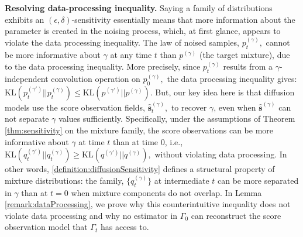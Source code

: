 \documentclass[11pt]{article}
\newcommand{\becca}[1]{\textcolor{dkred}{[becca: #1]}}
\theoremstyle{plain}
\newcommand{\1}{\mathbbm{1}}
\newcommand{\pdist}[2][]{p_{#1}^{(#2)}}
\newcommand{\qdist}[2][]{q_{#1}^{(#2)}}
\begin{document}
\textbf{Resolving data-processing inequality.} Saying a family of distributions exhibits an $(\epsilon,\delta)$-sensitivity essentially means that more information about the parameter is created in the noising process, which, at first glance, appears to violate the data processing inequality. The law of noised samples, $\pdist[t]{\gamma},$ cannot be more informative about $\gamma$ at any time $t$ than $\pdist{\gamma}$ (the target mixture), due to the data processing inequality. More precisely, since $\pdist[t]{\gamma}$ results from a $\gamma$-independent convolution operation on $\pdist[0]{\gamma},$ the data processing inequality gives: 
$\mathrm{KL}(\pdist[t]{\gamma'}||\pdist[t]{\gamma}) \leq \mathrm{KL}(\pdist{\gamma'}||\pdist{\gamma}).$ But, our key idea here is that diffusion models use the score observation fields, $\hat{\mathbf s}^{(\gamma)}_t,$ to recover $\gamma$, even when $\hat{\mathbf s}^{(\gamma)}$ can not separate $\gamma$ values sufficiently. Specifically, under the assumptions of Theorem \ref{thm:sensitivity} on the mixture family, the score observations can be more informative about $\gamma$ at time $t$ than at time 0, i.e., $\mathrm{KL}(\qdist[t]{\gamma'}||\qdist[t]{\gamma}) \geq \mathrm{KL}(\qdist{\gamma'}||\qdist{\gamma}),$ without violating data processing. In other words, \cref{definition:diffusionSensitivity} defines a structural property of mixture distributions: the family, $\{\qdist[t]{\gamma}\}$ at intermediate $t$ can be more separated in $\gamma$ than at $t=0$ when mixture components do not overlap.
 In Lemma \ref{remark:dataProcessing}, we prove why this counterintuitive inequality does not violate data processing and why no estimator in $\Gamma_0$ can reconstruct the score observation model that $\Gamma_t$ has access to. 
\end{document}
